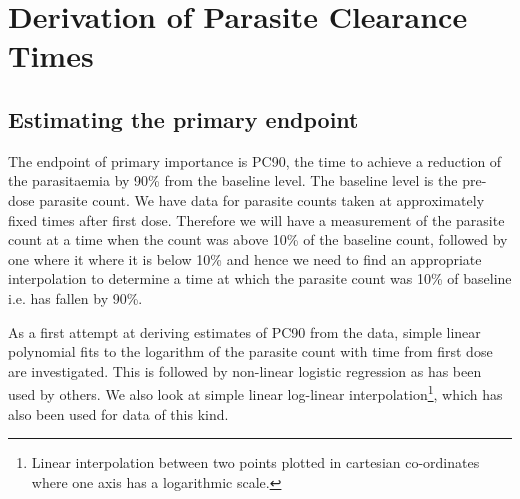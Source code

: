 \chapter{Derivation of Parasite Clearance Times}\label{ch:derivation}
\section{Estimating the primary endpoint}
The endpoint of primary importance is PC90, the time to achieve a reduction of the parasitaemia by 90\% from the baseline level. The baseline level is the pre-dose parasite count. We have data for parasite counts taken at approximately fixed times after first dose. Therefore we will have a measurement of the parasite count at a time when the count was above 10\% of the baseline count, followed by one where it where it is below 10\% and hence we need to find an appropriate interpolation to determine a time at which the parasite count was 10\% of baseline i.e. has fallen by 90\%.

As a first attempt at deriving estimates of PC90 from the data, simple linear polynomial fits to the logarithm of the parasite count with time from first dose are investigated. This is followed by non-linear logistic regression as has been used by others\cite{wootton}. We also look at simple linear log-linear interpolation\footnote{Linear interpolation between two points plotted in cartesian co-ordinates where one axis has a logarithmic scale.}, which has also been used for data of this kind\cite{carmello}.

